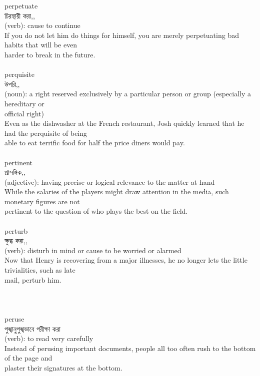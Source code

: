 \documentclass{article}
\begin{document}
{perpetuate}\\
{চিরস্থায়ী করা,,}\\
{(verb): cause to continue\\If you do not let him do things for himself, you are merely perpetuating bad habits that will be even\\harder to break in the future.\\}\\
{perquisite}\\
{উপরি,,}\\
{(noun): a right reserved exclusively by a particular person or group (especially a hereditary or\\official right)\\Even as the dishwasher at the French restaurant, Josh quickly learned that he had the perquisite of being\\able to eat terrific food for half the price diners would pay.\\}\\
{pertinent}\\
{প্রাসঙ্গিক,,}\\
{(adjective): having precise or logical relevance to the matter at hand\\While the salaries of the players might draw attention in the media, such monetary figures are not\\pertinent to the question of who plays the best on the field.\\}\\
{perturb}\\
{ক্ষুব্ধ করা,,}\\
{(verb): disturb in mind or cause to be worried or alarmed\\Now that Henry is recovering from a major illnesses, he no longer lets the little trivialities, such as late\\mail, perturb him.\\\\                                                                                \\}\\
{peruse}\\
{পুঙ্খানুপুঙ্খভাবে পরীক্ষা করা}\\
{(verb): to read very carefully\\Instead of perusing important documents, people all too often rush to the bottom of the page and\\plaster their signatures at the bottom.\\}\\
\end{document}
